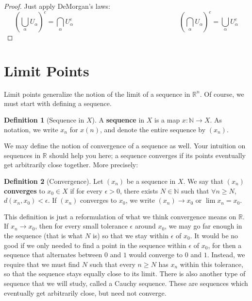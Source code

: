 \documentclass[11pt, oneside]{amsart}   	%
\theoremstyle{definition}
\newtheorem{definition}{Definition}[section]
\begin{document}
	\begin{proof}
		Just apply DeMorgan's laws:
		$$
			(\bigcup_\alpha U_\alpha)^c = \bigcap_\alpha U_\alpha^c \;\;\;\;\;\;\;\;\;\;\;\;\;\;\;\;\;\;\;\;\;\;\;\;\;\;\;\;\;\;\;\;\;\;\;\;\;\;\;\;\;\;\;\;\;\;\;\;\;\;\;\;\;\;\;\;
			(\bigcap_\alpha U_\alpha)^c = \bigcup_\alpha U_\alpha^c
		$$
	\end{proof}

\section{Limit Points}

	Limit points generalize the notion of the limit of a sequence in $\mathbb R^n$. Of course, we must start with defining a sequence.
	
	\begin{definition}[Sequence in $X$]
		A \textbf{sequence} in $X$ is a map $x : \mathbb N\rightarrow X$. As notation, we write $x_n$ for $x(n)$, and denote the entire sequence by $(x_n)$.
	\end{definition}
	
	We may define the notion of convergence of a sequence as well. Your intuition on sequences in $\mathbb R$ should help you here; a sequence converges 
	if its points eventually get arbitrarily close together. More precisely:
	
	\begin{definition}[Convergence]
		Let $(x_n)$ be a sequence in $X$. We say that $(x_n)$ \textbf{converges} to $x_0\in X$ if for every $\epsilon > 0$, there exists $N\in\mathbb N$ 
		such that $\forall n\geq N$, $d(x_n, x_0) < \epsilon$. If $(x_n)$ converges to $x_0$, we write $(x_n)\rightarrow x_0$ or $\lim x_n = x_0$.
	\end{definition}
	
	This definition is just a reformulation of what we think convergence means on $\mathbb R$. If $x_n\rightarrow x_0$, then for every small tolerance $\epsilon
	$ around $x_0$, we may go far enough in the sequence (that is what $N$ is) so that we stay within $\epsilon$ of $x_0$. It would be no good if we only 
	needed to find a point in the sequence within $\epsilon$ of $x_0$, for then a sequence that alternates between $0$ and $1$ would converge to $0$ and 
	$1$. Instead, we require that we must find $N$ such that every $n\geq N$ has $x_n$ within this tolerance, so that the sequence stays equally close 
	to its limit. There is also another type of sequence that we will study, called a Cauchy sequence. These are sequences which eventually get arbitrarily close, 
	but need not converge. 
	
\end{document}
